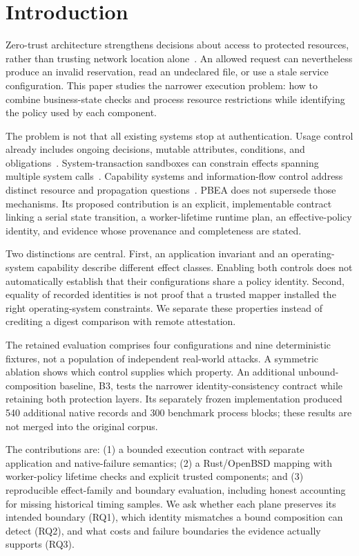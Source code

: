 \documentclass[electronics,article,submit,pdftex,moreauthors]{Definitions/mdpi}
\begin{document}
\section{Introduction}\label{sec:introduction}
Zero-trust architecture strengthens decisions about access to protected resources, rather than trusting network location alone~\cite{rose2020zta,chandramouli2023zta}. An allowed request can nevertheless produce an invalid reservation, read an undeclared file, or use a stale service configuration. This paper studies the narrower execution problem: how to combine business-state checks and process resource restrictions while identifying the policy used by each component.

The problem is not that all existing systems stop at authentication. Usage control already includes ongoing decisions, mutable attributes, conditions, and obligations~\cite{park2004ucon}. System-transaction sandboxes can constrain effects spanning multiple system calls~\cite{jana2011txbox}. Capability systems and information-flow control address distinct resource and propagation questions~\cite{watson2010capsicum,krohn2007flume}. PBEA does not supersede those mechanisms. Its proposed contribution is an explicit, implementable contract linking a serial state transition, a worker-lifetime runtime plan, an effective-policy identity, and evidence whose provenance and completeness are stated.

Two distinctions are central. First, an application invariant and an operating-system capability describe different effect classes. Enabling both controls does not automatically establish that their configurations share a policy identity. Second, equality of recorded identities is not proof that a trusted mapper installed the right operating-system constraints. We separate these properties instead of crediting a digest comparison with remote attestation.

The retained evaluation comprises four configurations and nine deterministic fixtures, not a population of independent real-world attacks. A symmetric ablation shows which control supplies which property. An additional unbound-composition baseline, B3, tests the narrower identity-consistency contract while retaining both protection layers. Its separately frozen implementation produced 540 additional native records and 300 benchmark process blocks; these results are not merged into the original corpus.

The contributions are: (1) a bounded execution contract with separate application and native-failure semantics; (2) a Rust/OpenBSD mapping with worker-policy lifetime checks and explicit trusted components; and (3) reproducible effect-family and boundary evaluation, including honest accounting for missing historical timing samples. We ask whether each plane preserves its intended boundary (RQ1), which identity mismatches a bound composition can detect (RQ2), and what costs and failure boundaries the evidence actually supports (RQ3).
\end{document}
